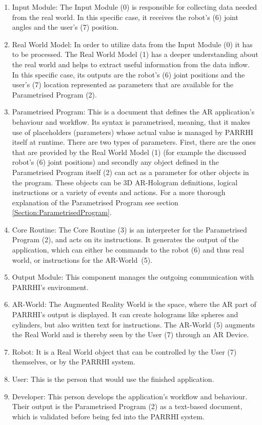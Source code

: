 \begin{enumerate}
	\addtocounter{enumi}{-1}
	\setlength\itemsep{-1em}
	\item Input Module: The Input Module (0) is responsible for collecting data needed from the real world. In this specific case, it  receives the robot's (6) joint angles and the user's (7) position.
	\item Real World Model: In order to utilize data from the Input Module (0) it has to be processed. The Real World Model (1) has a deeper understanding about the real world and helps to extract useful information from the data inflow. In this specific case, its outputs are the robot's (6) joint positions and the user's (7) location represented as parameters that are available for the Parametrised Program (2).
	\item Parametrised Program: This is a document that defines the AR application's behaviour and workflow. Its syntax is parametrised, meaning, that it makes use of placeholders (parameters) whose actual value is managed by PARRHI itself at runtime. There are two types of parameters. First, there are the ones that are provided by the Real World Model (1) (for example the discussed robot's (6) joint positions) and secondly any object defined in the Parametrised Program itself (2) can act as a parameter for other objects in the program. These objects can be 3D AR-Hologram definitions, logical instructions or a variety of events and actions. For a more thorough explanation of the Parametrised Program see section \ref{Section:ParametrisedProgram}.
	\item Core Routine: The Core Routine (3) is an interpreter for the Parametrised Program (2), and acts on its instructions. It generates the output of the application, which can either be commands to the robot (6) and thus real world, or instructions for the AR-World~(5).
	\item Output Module: This component manages the outgoing communication with PARRHI's environment. 
	\item AR-World: The Augmented Reality World is the space, where the AR part of PARRHI's output is displayed. It can create holograms like spheres and cylinders, but also written text for instructions. The AR-World (5) augments the Real World and is thereby seen by the User (7) through an AR Device.
	\item Robot: It is a Real World object that can be controlled by the User (7) themselves, or by the PARRHI system.
	\item User: This is the person that would use the finished application.
	\item Developer: This person develops the application's workflow and behaviour. Their output is the Parametrised Program (2) as a text-based document, which is validated before being fed into the PARRHI system.
\end{enumerate}


